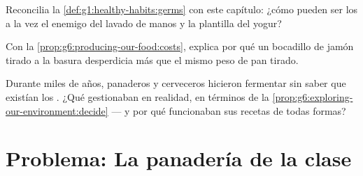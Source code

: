 \begin{exercise}[$\star\star$]\label{exo:g6:producing-our-food:10}
Reconcilia la \cref{def:g1:healthy-habits:germs} con este capítulo:
¿cómo pueden ser los  a la vez el enemigo del lavado de manos
y la plantilla del yogur?
\end{exercise}

\begin{exercise}[$\star\star$]\label{exo:g6:producing-our-food:11}
Con la \cref{prop:g6:producing-our-food:costs}, explica por qué un
bocadillo de jamón tirado a la basura desperdicia más que el mismo peso
de pan tirado.
\end{exercise}

\begin{exercise}[$\star\star\star$]\label{exo:g6:producing-our-food:12}
Durante miles de años, panaderos y cerveceros hicieron fermentar sin
saber que existían los . ¿Qué gestionaban en realidad, en
términos de la \cref{prop:g6:exploring-our-environment:decide} --- y
por qué funcionaban sus recetas de todas formas?
\end{exercise}

\section{Problema: La panadería de la clase}

